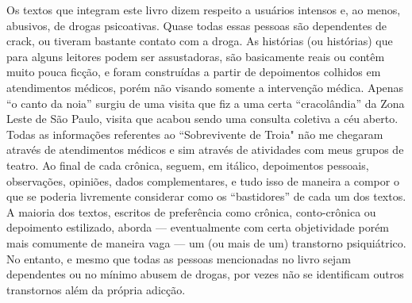 Os textos que integram este livro dizem respeito a usuários intensos e, ao
menos, abusivos, de drogas psicoativas. Quase todas essas pessoas são
dependentes de crack, ou tiveram bastante contato com a droga.
As histórias (ou histórias) que para alguns leitores podem ser assustadoras,
são basicamente reais ou contêm muito pouca ficção, e foram construídas a
partir de depoimentos colhidos em atendimentos médicos, porém não visando
somente a intervenção médica.
Apenas ``o canto da noia'' surgiu de uma visita que fiz a uma
certa “cracolândia” da Zona Leste de São Paulo, visita que acabou sendo uma
consulta coletiva a céu aberto.
Todas as informações referentes ao ``Sobrevivente de Troia"
não me chegaram através de atendimentos médicos e sim através de atividades com
meus grupos de teatro.
Ao final de cada crônica, seguem, em itálico, depoimentos pessoais,
observações, opiniões, dados complementares, e tudo isso de maneira a compor o
que se poderia livremente considerar como os “bastidores” de cada um dos
textos.
A maioria dos textos, escritos de preferência como crônica, conto-crônica ou
depoimento estilizado, aborda — eventualmente com certa objetividade porém mais
comumente de maneira vaga — um (ou mais de um) transtorno psiquiátrico.
No entanto, e mesmo que todas as pessoas mencionadas no livro sejam dependentes
ou no mínimo abusem de drogas, por vezes não se identificam outros transtornos
além da própria adicção.\par
